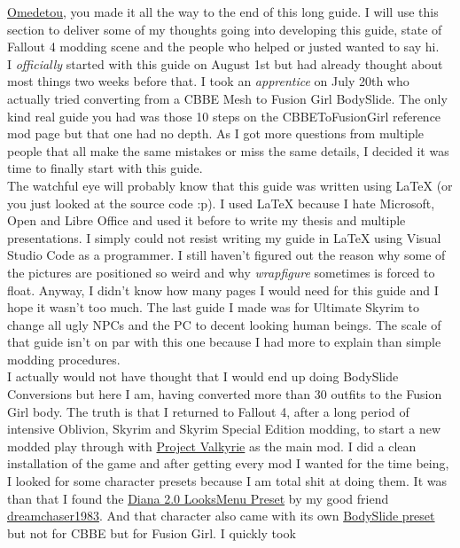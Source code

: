 \href{https://www.youtube.com/watch?v=hf1DkBQRQj4}{Omedetou}, you made it all the way to the end of this long guide. I will use this
section to deliver some of my thoughts going into developing this guide, state of Fallout 4 modding scene and the people who helped 
or justed wanted to say hi.\\
I \textit{officially} started with this guide on August 1st but had already thought about most things two weeks before that. I took 
an \textit{apprentice} on July 20th who actually tried converting from a CBBE Mesh to Fusion Girl BodySlide. The only kind real 
guide you had was those 10 steps on the CBBEToFusionGirl reference mod page but that one had no depth. As I got more questions 
from multiple people that all make the same mistakes or miss the same details, I decided it was time to finally start with this guide.\\
The watchful eye will probably know that this guide was written using LaTeX (or you just looked at the source code :p). I used LaTeX
because I hate Microsoft, Open and Libre Office and used it before to write my thesis and multiple presentations. I simply could not 
resist writing my guide in LaTeX using Visual Studio Code as a programmer. I still haven't figured out the reason why some of the 
pictures are positioned so weird and why \textit{wrapfigure} sometimes is forced to float. Anyway, I didn't know how many pages I would 
need for this guide and I hope it wasn't too much. The last guide I made was for Ultimate Skyrim to change all ugly NPCs and the PC 
to decent looking human beings. The scale of that guide isn't on par with this one because I had more to explain than simple modding 
procedures.\\
I actually would not have thought that I would end up doing BodySlide Conversions but here I am, having converted more than 30 
outfits to the Fusion Girl body. The truth is that I returned to Fallout 4, after a long period of intensive Oblivion, Skyrim and 
Skyrim Special Edition modding, to start a new modded play through with \href{https://www.nexusmods.com/fallout4/mods/28085}{Project Valkyrie} 
as the main mod. I did a clean installation of the game and after getting every mod I wanted for the time being, I looked for some 
character presets because I am total shit at doing them. It was than that I found the \href{https://www.nexusmods.com/fallout4/mods/39081}{Diana 2.0 LooksMenu Preset} 
by my good friend \href{https://www.nexusmods.com/fallout4/users/8744746}{dreamchaser1983}. And that character also came with 
its own \href{https://www.nexusmods.com/fallout4/mods/39010}{BodySlide preset} but not for CBBE but for Fusion Girl. I quickly took 
